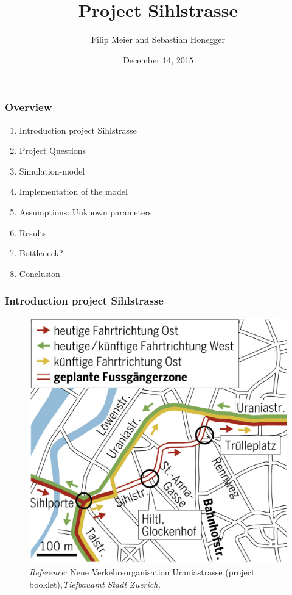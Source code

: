 \documentclass[9pt]{beamer}
\title{Project Sihlstrasse}
\institute[ETH Zurich] {Modelling and Simulating Social Systems\\ETH Zurich}
\author[Filip Meier and Sebastian Honegger]{Filip Meier and Sebastian Honegger}
\date{December 14, 2015}
\begin{document}
\maketitle

\begin{frame}
\frametitle{Overview}
\begin{enumerate}
\item	Introduction project Sihlstrasse
\newline
\item	Project Questions
\newline
\item	Simulation-model
\newline
\item	Implementation of the model
\newline
\item	Assumptions: Unknown parameters
\newline
\item	Results
\newline
\item	Bottleneck?
\newline
\item Conclusion
\end{enumerate}


\end{frame}

\begin{frame}
\frametitle{Introduction project Sihlstrasse}

\begin{figure}[h]
	\centering
		\includegraphics[width=0.6\columnwidth]{Plan_Sihlstrasse.png}
	\caption{\textit{Reference:} Neue Verkehrsorganisation Uraniastrasse (project booklet),\emph{Tiefbauamt Stadt Zuerich,}}
\end{figure}
\end{frame}
\end{document}
